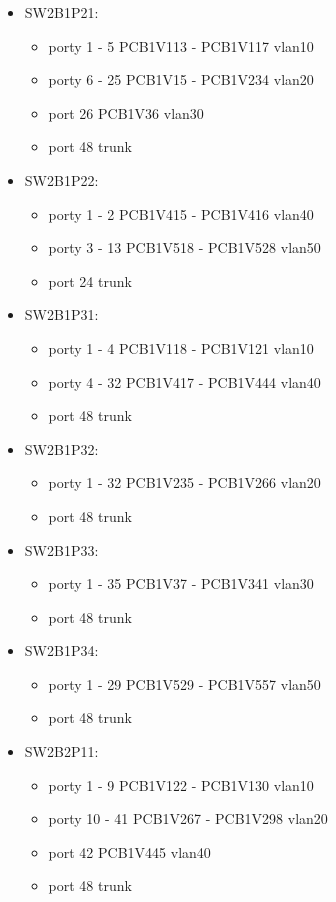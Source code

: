 \documentclass[a4paper, 12pt]{article}
\begin{document}
\begin{itemize}
\item SW2B1P21:
	\begin{itemize}
	\item porty 1 - 5 PCB1V113 - PCB1V117 vlan10
	\item porty 6 - 25 PCB1V15 - PCB1V234 vlan20
	\item port 26 PCB1V36 vlan30
	\item port 48 trunk
	\end{itemize}
\item SW2B1P22:
	\begin{itemize}
	\item porty 1 - 2 PCB1V415 - PCB1V416 vlan40
	\item porty 3 - 13 PCB1V518 - PCB1V528 vlan50
	\item port 24 trunk
	\end{itemize}
\item SW2B1P31:
	\begin{itemize}
	\item porty 1 - 4 PCB1V118 - PCB1V121 vlan10
	\item porty 4 - 32 PCB1V417 - PCB1V444 vlan40
	\item port 48 trunk
	\end{itemize}
\item SW2B1P32:
	\begin{itemize}
	\item porty 1 - 32 PCB1V235 - PCB1V266 vlan20
	\item port 48 trunk
	\end{itemize}
\item SW2B1P33:
	\begin{itemize}
	\item porty 1 - 35 PCB1V37 - PCB1V341 vlan30
	\item port 48 trunk
	\end{itemize}
\item SW2B1P34:
	\begin{itemize}
	\item porty 1 - 29 PCB1V529 - PCB1V557 vlan50
	\item port 48 trunk
	\end{itemize}
	
\item SW2B2P11:
	\begin{itemize}
	\item porty 1 - 9 PCB1V122 - PCB1V130 vlan10
	\item porty 10 - 41 PCB1V267 - PCB1V298 vlan20
	\item port 42 PCB1V445 vlan40
	\item port 48 trunk
	\end{itemize}
	

\end{itemize}
\end{document}
